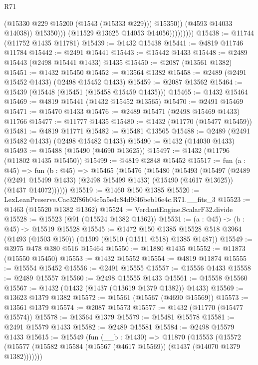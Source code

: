 \begin{lexlean}{R71}
\begin{coremodule}
                                (@15330 @229 @15200 (@1543 (@15333 @229)))
                                @15350))
                            (@4593 @14033 @14038))
                          @15350)))
                    (@11529 @13625 @14053 @14056)))))))))
@15438 := @11744 (@11752 @1435 @11781)
@15439 := @1432 @15438
@15441 := @4819 @11746 @11784
@15442 := @2491 @15441
@15443 := @15442 @1433
@15448 := @2489 @15443 (@2498 @15441 @1433) @1435
@15450 := @2087 (@13561 @1382)
@15451 := @1432 @15450
@15452 := @13564 @1382
@15458 := @2489 (@2491 @15452 @1433) (@2498 @15452 @1433)
@15459 := @2087 @13562
@15464 := @15439 (@15448 (@15451 (@15458 @15459 @1435)))
@15465 := @1432 @15464
@15469 := @4819 @15441 (@1432 @15452 @13565)
@15470 := @2491 @15469
@15471 := @15470 @1433
@15476 := @2489 @15471 (@2498 @15469 @1433) @11766
@15477 := @11777 @1435
@15480 := @1432 (@11770 (@15477 @15459))
@15481 := @4819 @11771
@15482 := @15481 @13565
@15488 := @2489 (@2491 @15482 @1433) (@2498 @15482 @1433)
@15490 := @1432 (@14030 @1433)
@15493 := @15488 (@15490 (@4690 @13625))
@15497 := @1432 (@11796 (@11802 @1435 @15450))
@15499 := @4819 @2848 @15452
@15517 := fun (a : @45) =>
  fun (b : @45) =>
  @15465
    (@15476
      (@15480
        (@15493
          (@15497
            (@2489
              (@2491 @15499 @1433)
              (@2498 @15499 @1433)
              (@15490 (@4617 @13625))
              (@1437 @14072))))))
@15519 := @1460 @150 @1385
@15520 := LexLeanPreserve.Cac32f86b04c5a5e4c84d9f46beb16e4c.R71.__fits_3
@15523 := @1463 (@15520 @1382 @1362)
@15524 := VerdantEngine.ScalarF32.divide
@15528 := @15523 (@91 (@15524 @1382 @1362))
@15531 := (a : @45) -> (b : @45) -> @15519 @15528
@15545 := @1472
    @150
    @1385
    @15528
    @518
    @3964
    (@1493 (@1503 @150))
    (@1509 (@1510 (@1511 @518) @1385 @1487))
@15549 := @3975 @478 @380 @516 @15464
@15550 := @11880 @1435
@15552 := @11873 (@15550 @15450)
@15553 := @1432 @15552
@15554 := @4819 @11874
@15555 := @15554 @15452
@15556 := @2491 @15555
@15557 := @15556 @1433
@15558 := @2489 @15557
@15560 := @2498 @15555 @1433
@15561 := @15558 @15560
@15567 := @1432 (@1432 (@1437 (@13619 @1379 @1382)) @1433)
@15569 := @13623 @1379 @1382
@15572 := @15561 (@15567 (@4690 @15569))
@15573 := @13561 @1379
@15574 := @2087 @15573
@15577 := @1432 (@11770 (@15477 @15574))
@15578 := @13564 @1379
@15579 := @15481 @15578
@15581 := @2491 @15579 @1433
@15582 := @2489 @15581
@15584 := @2498 @15579 @1433
@15615 := @15549
    (fun (__b : @1430) =>
    @11870
      (@15553
        (@15572 (@15577 (@15582 @15584 (@15567 (@4617 @15569)) (@1437 (@14070 @1379 @1382)))))))

\end{coremodule}
\end{lexlean}
